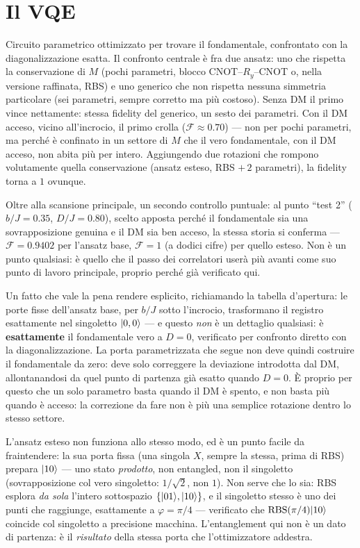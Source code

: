 \documentclass[11pt,a4paper]{article}
\begin{document}
\section{Il VQE}

Circuito parametrico ottimizzato per trovare il fondamentale, confrontato
con la diagonalizzazione esatta. Il confronto centrale è fra due ansatz:
uno che rispetta la conservazione di $M$ (pochi parametri, blocco
CNOT--$R_y$--CNOT o, nella versione raffinata, RBS) e uno generico che non
rispetta nessuna simmetria particolare (sei parametri, sempre corretto ma
più costoso). Senza DM il primo vince nettamente: stessa fidelity del
generico, un sesto dei parametri. Con il DM acceso, vicino all'incrocio,
il primo crolla ($\mathcal F\approx0.70$) --- non per pochi parametri, ma
perché è confinato in un settore di $M$ che il vero fondamentale, con il
DM acceso, non abita più per intero. Aggiungendo due rotazioni che rompono
volutamente quella conservazione (ansatz esteso, RBS $+\,2$ parametri), la
fidelity torna a $1$ ovunque.

Oltre alla scansione principale, un secondo controllo puntuale: al punto
``test 2'' ($b/J=0.35$, $D/J=0.80$), scelto apposta perché il
fondamentale sia una sovrapposizione genuina e il DM sia ben acceso, la
stessa storia si conferma --- $\mathcal F=0.9402$ per l'ansatz base,
$\mathcal F=1$ (a dodici cifre) per quello esteso. Non è un punto
qualsiasi: è quello che il passo dei correlatori userà più avanti come
suo punto di lavoro principale, proprio perché già verificato qui.

Un fatto che vale la pena rendere esplicito, richiamando la tabella
d'apertura: le porte fisse dell'ansatz base, per $b/J$ sotto
l'incrocio, trasformano il registro esattamente nel singoletto
$\lvert 0,0\rangle$ --- e questo \emph{non} è un dettaglio qualsiasi: è
\textbf{esattamente} il fondamentale vero a $D=0$, verificato per
confronto diretto con la diagonalizzazione. La porta parametrizzata che
segue non deve quindi costruire il fondamentale da zero: deve solo
correggere la deviazione introdotta dal DM, allontanandosi da quel punto
di partenza già esatto quando $D=0$. È proprio per questo che un solo
parametro basta quando il DM è spento, e non basta più quando è acceso:
la correzione da fare non è più una semplice rotazione dentro lo stesso
settore.

L'ansatz esteso non funziona allo stesso modo, ed è un punto facile da
fraintendere: la sua porta fissa (una singola $X$, sempre la stessa,
prima di RBS) prepara $\lvert 10\rangle$ --- uno stato \emph{prodotto}, non
entangled, non il singoletto (sovrapposizione col vero singoletto:
$1/\sqrt2$, non $1$). Non serve che lo sia: RBS esplora \emph{da sola}
l'intero sottospazio $\{\lvert 01\rangle,\lvert 10\rangle\}$, e il singoletto stesso è
uno dei punti che raggiunge, esattamente a $\varphi=\pi/4$ --- verificato
che $\text{RBS}(\pi/4)\lvert 10\rangle$ coincide col singoletto a precisione
macchina. L'entanglement qui non è un dato di partenza: è il
\emph{risultato} della stessa porta che l'ottimizzatore addestra.
\end{document}
